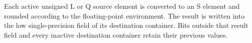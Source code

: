 Each active unsigned L or Q source element is converted to an S element and
rounded according to the floating-point environment. The result is written
into the low single-precision field of its destination container. Bits
outside that result field and every inactive destination container retain
their previous values.
